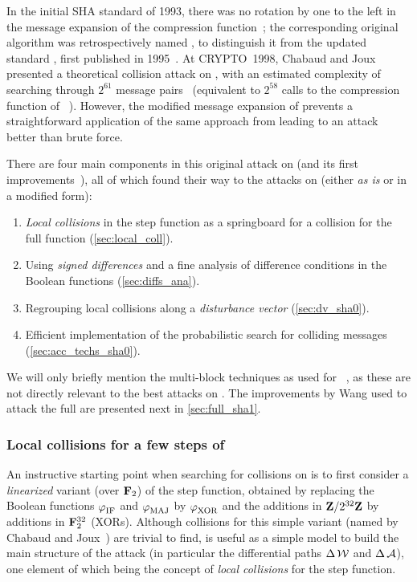 In the initial SHA standard of 1993, there was no rotation by one to the left in the message expansion of the compression function~\cite{Nist-SHA0}; the corresponding original algorithm was
retrospectively named \shazero, to distinguish it from the updated standard \shaone, first published in 1995~\cite{Nist-SHA1}.
At CRYPTO~1998, Chabaud and Joux presented a theoretical collision attack on \shazero, with an estimated complexity of searching through $2^{61}$ message pairs~\cite{DBLP:conf/crypto/ChabaudJ98}
(equivalent to $2^{58}$ calls to the compression function of \shazero~\cite{DBLP:journals/joc/BihamCJ15}). However, the modified message
expansion of \shaone prevents a straightforward application of the same approach from leading to an attack better than brute force.

There are four main components in this original attack on \shazero (and its first improvements~\cite{DBLP:conf/crypto/BihamC04,DBLP:conf/eurocrypt/BihamCJCLJ05,DBLP:journals/joc/BihamCJ15}),
all of which found their way to the attacks on \shaone (either \emph{as is} or in a modified form):
\begin{enumerate}
\item \emph{Local collisions} in the step function as a springboard for a collision for the full function (\autoref{sec:local_coll}).
\item Using \emph{signed differences} and a fine analysis of difference conditions in the Boolean functions (\autoref{sec:diffs_ana}).
\item Regrouping local collisions along a \emph{disturbance vector} (\autoref{sec:dv_sha0}).
\item Efficient implementation of the probabilistic search for colliding messages (\autoref{sec:acc_techs_sha0}).
\end{enumerate}

We will only briefly mention the multi-block techniques as used for \shazero~\cite{DBLP:conf/eurocrypt/BihamCJCLJ05,DBLP:journals/joc/BihamCJ15}, as these are not directly relevant to the best attacks on \shaone.
The improvements by Wang \etal used to attack the full \shaone are presented next in \autoref{sec:full_sha1}.

\subsubsection{Local collisions for a few steps of \sha}
\label{sec:local_coll}
An instructive starting point when searching for collisions on \sha is to first consider a \emph{linearized} variant (over $\mathbf{F}_{2}$) of the step function, obtained by replacing
the Boolean functions $\operatorname{\varphi}_\text{IF}$ and $\operatorname{\varphi}_\text{MAJ}$ by $\operatorname{\varphi}_\text{XOR}$ and the additions in $\mathbf{Z}/2^{32}\mathbf{Z}$ by additions in $\mathbf{F}_{2}^{32}$ (\ie XORs). Although collisions for this simple
variant (named \shiun by Chabaud and Joux~\cite{DBLP:conf/crypto/ChabaudJ98}) are trivial to find, \shiun is useful as a simple model to build the main structure of the attack
(in particular the differential paths $\operatorname{\Delta}\mathcal{W}$ and $\operatorname{\Delta}\mathcal{A}$),
one element of which being the concept of \emph{local collisions} for the step function.


